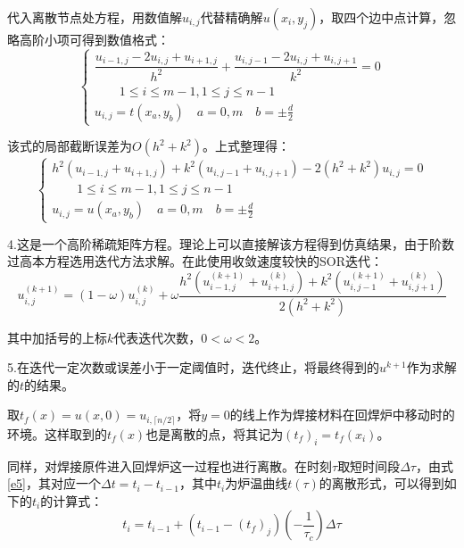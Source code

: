 \documentclass[a4paper,12pt]{ctexart} %
\begin{document}
	代入离散节点处方程，用数值解$u_{i,j}$代替精确解$u\left(x_i,y_j\right)$，取四个边中点计算，忽略高阶小项可得到数值格式：
	\begin{equation}
	\begin{cases}
	\dfrac{u_{i-1,j}-2u_{i,j}+u_{i+1,j}}{h^2}+\dfrac{u_{i,j-1}-2u_{i,j}+u_{i,j+1}}{k^2}=0\\[1em]
	\quad\quad 1\leqslant i\leqslant m-1,1\leqslant j\leqslant n-1\\
	u_{i,j}=t\left(x_a,y_b\right)\quad a=0,m\quad b=\pm \frac{d}{2}
	\end{cases}
	\end{equation}\par
	该式的局部截断误差为$O\left(h^2+k^2\right)$。上式整理得：
	\begin{equation}
	\begin{cases}
	 h^2\left(u_{i-1,j}+u_{i+1,j}\right) + k^2\left(u_{i,j-1}+u_{i,j+1}\right) -2\left(h^2+k^2\right)u_{i,j} = 0\\
	\quad\quad 1\leqslant i\leqslant m-1,1\leqslant j\leqslant n-1\\
	u_{i,j}=u\left(x_a,y_b\right)\quad a=0,m\quad b=\pm \frac{d}{2}
	\end{cases}
	\end{equation}\par
	4.这是一个高阶稀疏矩阵方程。理论上可以直接解该方程得到仿真结果，由于阶数过高本方程选用迭代方法求解。在此使用收敛速度较快的SOR迭代：
	\begin{equation}
	u_{i,j}^{(k+1)} = (1-\omega)u_{i,j}^{(k)} + \omega \frac{h^2(u_{i-1,j}^{(k+1)}+u_{i+1,j}^{(k)}) + k^2(u_{i,j-1}^{(k+1)}+u_{i,j+1}^{(k)})}{2(h^2+k^2)}
	\end{equation}\par
	其中加括号的上标$k$代表迭代次数，$0<\omega<2$。\par
	5.在迭代一定次数或误差小于一定阈值时，迭代终止，将最终得到的$u^{k+1}$作为求解的$t$的结果。\par
	取$t_f(x) = u(x,0) = u_{i,\lceil n/2 \rceil}$，将$y=0$的线上作为焊接材料在回焊炉中移动时的环境。这样取到的$t_f(x)$也是离散的点，将其记为$(t_f)_i = t_f(x_i)$。\par
	同样，对焊接原件进入回焊炉这一过程也进行离散。在时刻$\tau$取短时间段$\varDelta \tau$，由式\ref{e5}，其对应一个$\varDelta t = t_i - t_{i-1}$，其中$t_i$为炉温曲线$t(\tau)$的离散形式，可以得到如下的$t_i$的计算式：
	\begin{equation}
	t_i = t_{i-1} + (t_{i-1} - (t_f)_j)(-\frac{1}{\tau_c}) \varDelta \tau
	\end{equation}\par
\end{document}
